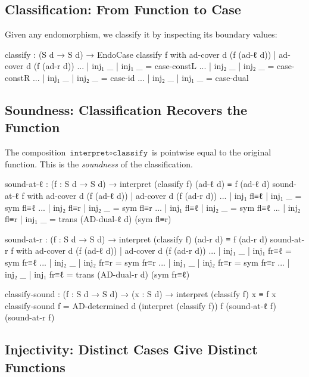 \documentclass[11pt,a4paper]{book}
\begin{document}
\subsection{Classification: From Function to Case}

Given any endomorphism, we classify it by inspecting its boundary values:

\begin{code}
  classify : (S d → S d) → EndoCase
  classify f with ad-cover d (f (ad-ℓ d)) | ad-cover d (f (ad-r d))
  ... | inj₁ _ | inj₁ _ = case-constL
  ... | inj₂ _ | inj₂ _ = case-constR
  ... | inj₁ _ | inj₂ _ = case-id
  ... | inj₂ _ | inj₁ _ = case-dual
\end{code}

\subsection{Soundness: Classification Recovers the Function}

The composition $\texttt{interpret} \circ \texttt{classify}$ is pointwise
equal to the original function. This is the \emph{soundness} of the classification.

\begin{code}
  sound-at-ℓ : (f : S d → S d) →
               interpret (classify f) (ad-ℓ d) ≡ f (ad-ℓ d)
  sound-at-ℓ f with ad-cover d (f (ad-ℓ d)) | ad-cover d (f (ad-r d))
  ... | inj₁ fl≡ℓ | inj₁ _     = sym fl≡ℓ
  ... | inj₂ fl≡r | inj₂ _     = sym fl≡r
  ... | inj₁ fl≡ℓ | inj₂ _     = sym fl≡ℓ
  ... | inj₂ fl≡r | inj₁ _     = trans (AD-dual-ℓ d) (sym fl≡r)

  sound-at-r : (f : S d → S d) →
               interpret (classify f) (ad-r d) ≡ f (ad-r d)
  sound-at-r f with ad-cover d (f (ad-ℓ d)) | ad-cover d (f (ad-r d))
  ... | inj₁ _     | inj₁ fr≡ℓ = sym fr≡ℓ
  ... | inj₂ _     | inj₂ fr≡r = sym fr≡r
  ... | inj₁ _     | inj₂ fr≡r = sym fr≡r
  ... | inj₂ _     | inj₁ fr≡ℓ = trans (AD-dual-r d) (sym fr≡ℓ)

  classify-sound : (f : S d → S d) →
                   (x : S d) → interpret (classify f) x ≡ f x
  classify-sound f = AD-determined d
    (interpret (classify f)) f
    (sound-at-ℓ f) (sound-at-r f)
\end{code}

\subsection{Injectivity: Distinct Cases Give Distinct Functions}
\end{document}

